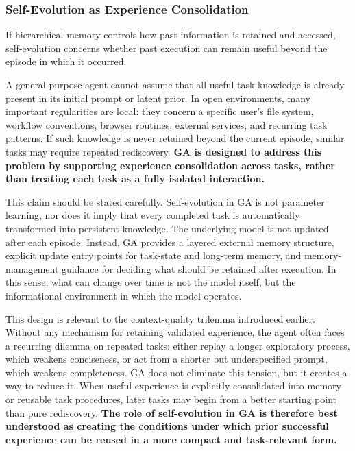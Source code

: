 \subsubsection{Self-Evolution as Experience Consolidation}

If hierarchical memory controls how past information is retained and accessed, self-evolution concerns whether past execution can remain useful beyond the episode in which it occurred.

A general-purpose agent cannot assume that all useful task knowledge is already present in its initial prompt or latent prior. In open environments, many important regularities are local: they concern a specific user's file system, workflow conventions, browser routines, external services, and recurring task patterns. If such knowledge is never retained beyond the current episode, similar tasks may require repeated rediscovery. \textbf{GA is designed to address this problem by supporting experience consolidation across tasks, rather than treating each task as a fully isolated interaction.}

This claim should be stated carefully. Self-evolution in GA is not parameter learning, nor does it imply that every completed task is automatically transformed into persistent knowledge. The underlying model is not updated after each episode. Instead, GA provides a layered external memory structure, explicit update entry points for task-state and long-term memory, and memory-management guidance for deciding what should be retained after execution. In this sense, what can change over time is not the model itself, but the informational environment in which the model operates.

This design is relevant to the context-quality trilemma introduced earlier. Without any mechanism for retaining validated experience, the agent often faces a recurring dilemma on repeated tasks: either replay a longer exploratory process, which weakens conciseness, or act from a shorter but underspecified prompt, which weakens completeness. GA does not eliminate this tension, but it creates a way to reduce it. When useful experience is explicitly consolidated into memory or reusable task procedures, later tasks may begin from a better starting point than pure rediscovery. \textbf{The role of self-evolution in GA is therefore best understood as creating the conditions under which prior successful experience can be reused in a more compact and task-relevant form.}


